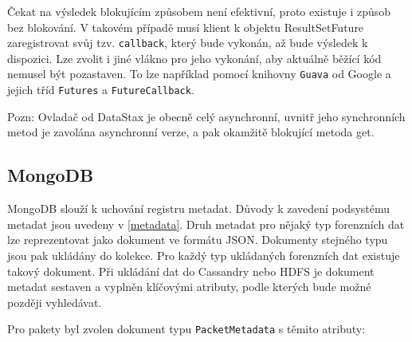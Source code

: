 Čekat na výsledek blokujícím způsobem není efektivní, proto existuje i způsob bez blokování. V takovém případě musí klient k objektu ResultSetFuture zaregistrovat svůj tzv. \texttt{callback}, který bude vykonán, až bude výsledek k dispozici.
Lze zvolit i jiné vlákno pro jeho vykonání, aby aktuálně běžící kód nemusel být pozastaven. To lze například pomocí knihovny \texttt{Guava} od Google a jejich tříd \texttt{Futures} a \texttt{FutureCallback}.

Pozn: Ovladač od DataStax je obecně celý asynchronní, uvnitř jeho synchronních metod je zavolána asynchronní verze, a pak okamžitě blokující metoda get.

\subsection{MongoDB}
MongoDB slouží k uchování registru metadat. Důvody k zavedení podsystému metadat jsou uvedeny v \ref{metadata}. Druh metadat pro nějaký typ forenzních dat lze reprezentovat jako dokument ve formátu JSON. Dokumenty stejného typu jsou pak ukládány do kolekce. Pro každý typ ukládaných forenzních dat existuje takový dokument. Při ukládání dat do Cassandry nebo HDFS je dokument metadat sestaven a vyplněn klíčovými atributy, podle kterých bude možné později vyhledávat.

\vspace{0.5cm}
\noindent Pro pakety byl zvolen dokument typu \texttt{PacketMetadata} s těmito atributy:

